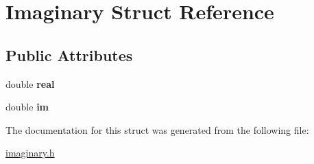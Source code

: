 \hypertarget{structImaginary}{\section{Imaginary Struct Reference}
\label{structImaginary}
}
\subsection*{Public Attributes}
\begin{DoxyCompactItemize}
\item 
\hypertarget{structImaginary_ae4caefa8ef95e32a9a2de6e9765495e8}{double {\bfseries real}}\label{structImaginary_ae4caefa8ef95e32a9a2de6e9765495e8}

\item 
\hypertarget{structImaginary_adb6d21ae9e4ce28b22d24931405e3d68}{double {\bfseries im}}\label{structImaginary_adb6d21ae9e4ce28b22d24931405e3d68}

\end{DoxyCompactItemize}


The documentation for this struct was generated from the following file\+:\begin{DoxyCompactItemize}
\item 
\hyperlink{imaginary_8h}{imaginary.\+h}\end{DoxyCompactItemize}
